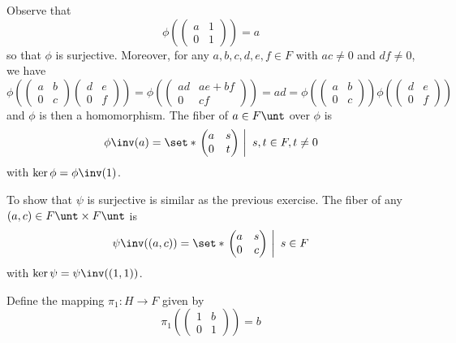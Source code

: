 \begin{solalph}
    \item Observe that
    \[\phi\left(
    \begin{pmatrix}
        a & 1 \\
        0 & 1
    \end{pmatrix}\right) = a\]
    so that $\phi$ is surjective. Moreover, for any $a, b, c, d, e, f \in F$ with $ac \neq 0$ and $df \neq 0$, we have
    \[\phi\left(
    \begin{pmatrix}
        a & b \\
        0 & c
    \end{pmatrix}
    \begin{pmatrix}
        d & e \\
        0 & f
    \end{pmatrix}\right) = 
    \phi\left(
    \begin{pmatrix}
        ad & ae + bf \\
        0 & cf
    \end{pmatrix}\right) = ad = 
    \phi\left(
    \begin{pmatrix}
        a & b \\
        0 & c
    \end{pmatrix}\right)
    \phi\left(
    \begin{pmatrix}
        d & e \\
        0 & f
    \end{pmatrix}\right)\]
    and $\phi$ is then a homomorphism. The fiber of $a \in F\unt$ over $\phi$ is
    \[\phi\inv(a) = 
    \set*{\left.
    \begin{pmatrix}
        a & s \\
        0 & t
    \end{pmatrix}~\right|~s, t \in F, t \neq 0}\]
    with $\ker\phi = \phi\inv(1)$.
    \item To show that $\psi$ is surjective is similar as the previous exercise. The fiber of any $(a, c) \in F\unt \times F\unt$ is
    \[\psi\inv((a, c)) = 
    \set*{\left.
    \begin{pmatrix}
        a & s \\
        0 & c
    \end{pmatrix}~\right|~s \in F}\]
    with $\ker\psi = \psi\inv((1, 1))$.
    \item Define the mapping $\pi_1 : H \to F$ given by
    \[\pi_1\left(
    \begin{pmatrix}
        1 & b \\
        0 & 1
    \end{pmatrix}\right) = b\]

\end{solalph}
